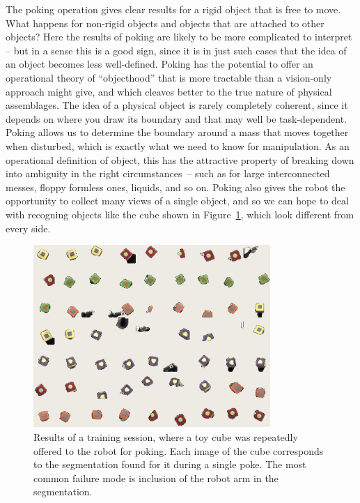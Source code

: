 The poking operation gives clear results for a rigid object that is
free to move.  What happens for non-rigid objects and objects that are
attached to other objects?  Here the results of poking are likely to
be more complicated to interpret -- but in a sense this is a good
sign, since it is in just such cases that the idea of an object
becomes less well-defined.  Poking has the potential to offer an
operational theory of ``objecthood'' that is more tractable than a
vision-only approach might give, and which cleaves better to the true
nature of physical assemblages.  The idea of a physical object is
rarely completely coherent, since it depends on where you draw its
boundary and that may well be task-dependent.  Poking allows us to
determine the boundary around a mass that moves together when
disturbed, which is exactly what we need to know for manipulation.  As
an operational definition of object, this has the attractive property
of breaking down into ambiguity in the right circumstances~-- such as
for large interconnected messes, floppy formless ones, liquids, and so
on.  Poking also gives the robot the opportunity
to collect many views of a single object, and so we can hope to deal
with recogn\iz{}ing objects like the cube shown in
Figure~\ref{fig:sample-results}, which look different from every side.


\begin{figure}[tbh]
  \centerline{\includegraphics[width=9cm]{experiment-montage}}
  \caption{ 
  \label{fig:sample-results}
Results of a training session, where a toy cube was
  repeatedly offered to the robot for poking.  Each image of the cube
  corresponds to the segmentation found for it during a single poke.
  The most common failure mode is inclusion of the robot arm in the
  segmentation.  
}
\end{figure}

